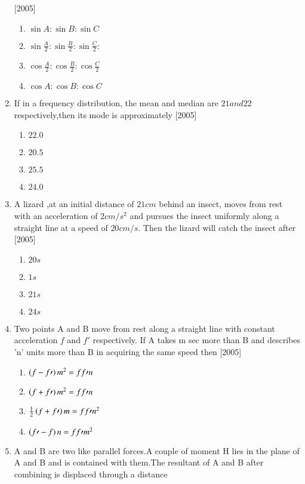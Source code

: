 \documentclass[journal,12pt,twocolumn]{IEEEtran}
\theoremstyle{remark}
\begin{document}
\begin{enumerate}[start=16]
\hfill{[2005]}
\begin{enumerate}
\item $\sin {A} \colon \sin {B} \colon \sin {C}$
\item $\sin{\frac{A}{2}}\colon \sin{\frac{B}{2}}\colon \sin{\frac{C}{2}}\colon$
\item $\cos{\frac{A}{2}}\colon \cos{\frac{B}{2}}\colon \cos{\frac{C}{2}}$
\item $\cos {A} \colon \cos{B}\colon \cos{C}$
\end{enumerate}
\item If in a frequency distribution, the mean and median are $21 and 22$ respectively,then its mode is approximately
\hfill{[2005]}
\begin{enumerate}
\item $22.0$
\item $20.5$
\item $25.5$
\item $24.0$
\end{enumerate}
\item A lizard ,at an initial distance of $21 cm$ behind an insect, moves from rest with an acceleration of $2cm/{s}^2$ and pursues the insect uniformly along a straight line at a speed of $20cm/s$. Then the lizard will catch the insect after
\hfill{[2005]}
\begin{enumerate}
\item $20s$
\item $1s$
\item $21s$
\item $24s$
\end{enumerate}
\item Two points A and B move from rest along a straight line with constant acceleration $f$ and $f'$ respectively. If A takes m sec more than B and describes 'n' units more than B in acquiring the same speed then 
\hfill{[2005]}
\begin{enumerate}
\item $\left(f-f\prime\right)m^2 =ff\prime n$
\item $\left(f+f\prime\right)m^2 =ff\prime n$
\item $\frac{1}{2}\left(f+f\prime\right)m =ff\prime n^2$
\item $\left(f\prime-f\right)n =ff\prime m^2$
\end{enumerate}
\item A and B are two like parallel forces.A couple of moment H lies in the plane of A and B and is contained with them.The resultant of A and B after combining is displaced through a distance

\end{enumerate}
\end{document}
